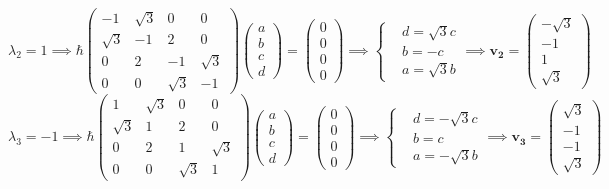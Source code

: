\documentclass[12pt]{article}
\theoremstyle{definition}
\theoremstyle{definition}
\theoremstyle{definition}
\theoremstyle{definition}
\theoremstyle{definition}
\theoremstyle{example}
\theoremstyle{note}
\theoremstyle{remark}
\theoremstyle{example}
\begin{document}
			\begin{equation*}
			\lambda_{2} =1 \implies \hbar\begin{pmatrix}
			-1 & \sqrt{3} & 0 & 0 \\
			\sqrt{3} & -1 & 2 & 0\\
			0 & 2 & -1 & \sqrt{3} \\
			0 & 0 & \sqrt{3} & -1
			\end{pmatrix}\begin{pmatrix}
			a \\ b \\ c \\ d
			\end{pmatrix} = \begin{pmatrix}
			0 \\ 0 \\0  \\0 
			\end{pmatrix} \implies \begin{cases}
			&d = \sqrt{3}c  \\
			&b = -c\\
			&a = \sqrt{3}b
			\end{cases} \implies \boldsymbol{v_{2}} = \begin{pmatrix}
			-\sqrt{3} \\ -1 \\ 1 \\ \sqrt{3}
			\end{pmatrix}
			\end{equation*}    
			\begin{equation*}
			\lambda_{3} =-1 \implies \hbar\begin{pmatrix}
			1 & \sqrt{3} & 0 & 0 \\
			\sqrt{3} & 1 & 2 & 0\\
			0 & 2 & 1 & \sqrt{3} \\
			0 & 0 & \sqrt{3} & 1
			\end{pmatrix}\begin{pmatrix}
			a \\ b \\ c \\ d
			\end{pmatrix} = \begin{pmatrix}
			0 \\ 0 \\0  \\0 
			\end{pmatrix} \implies \begin{cases}
			&d = -\sqrt{3}c  \\
			&b = c\\
			&a = -\sqrt{3} b
			\end{cases} \implies \boldsymbol{v_3} = \begin{pmatrix}
			\sqrt{3} \\ -1 \\ -1 \\ \sqrt{3}
			\end{pmatrix}
			\end{equation*}  
\end{document}
